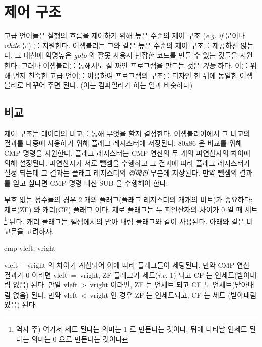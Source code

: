 
\section{제어 구조}
\label{sec:control}
고급 언어들은 실행의 흐름을 제어하기 위해 높은 수준의 제어 구조
(\emph{e.g.} \emph{if} 문이나 \emph{while} 문) 를 지원한다. 어셈블리는
그와 같은 높은 수준의 제어 구조를 제공하진 않는다. 그 대신에 악명높은 
\emph{goto} 와 잘못 사용시 난잡한 코드를 만들 수 있는 것들을 지원한다. 그러나 
어셈블리를 통해서도 잘 짜인 프로그램을 만드는 것은 \emph{가능} 하다. 이를 위해
먼저 친숙한 고급 언어를 이용하여 프로그램의 구조를 디자인 한 뒤에 동일한 어셈블리로
바꾸어 주면 된다. (이는 컴파일러가 하는 일과 비슷하다) 

\subsection{비교} 

제어 구조는 데이터의 비교를 통해 무엇을 할지 결정한다. 어셈블리어에서 그 비교의
결과를 나중에 사용하기 위해 플래그 레지스터에 저장된다. 80x86 은 비교를 위해 
{\code CMP} 명령을 지원한다. 플래그 레지스터는 {\code CMP} 연산의 두 개의
피연산자의 차이에 의해 설정된다. 피연산자가 서로 뺄셈을 수행하고 그 결과에 따라 
플래그 레지스터가 설정 되는데 그 결과는 플래그 레지스터의 \emph{정해진} 부분에 저장된다.
만약 뺄셈의 결과를 얻고 싶다면 {\code CMP} 명령 대신
SUB 을 수행해야 한다. 

부호 없는 정수들의 경우 2 개의 플래그(플래그 레지스터의 개개의 비트)가 중요하다:
제로(ZF)  와 캐리(CF)  플래그 이다. 
제로 플래그는 두 피연산자의 차이가 0 일 때 세트\footnote{역자 주) 여기서 세트 된다는
의미는 1 로 만든다는 것이다. 뒤에 나타날 언세트 된다는 의미는 0 으로 만든다는 것이다}
된다. 캐리 플래그는 뺄셈에서의 받아 내림 플래그와 같이 사용된다. 아래와 같은 비교문을 고려하자.

\begin{AsmCodeListing}[frame=none, numbers=none]
      cmp    vleft, vright
\end{AsmCodeListing}
{\code vleft~-~vright} 의 차이가 계산되어 이에 따라 플래그들이 세팅된다. 만약 {\code CMP}
연산 결과가 0 이라면 {\code vleft~=~vright}, ZF 플래그가 세트(\emph{i.e.} 1) 되고 
CF 는 언세트(받아내림 없음) 된다. 만일 {\code vleft~>~vright} 이라면, ZF 는 언세트 되고
CF 도 언세트(받아내림 없음) 된다. 만약 {\code vleft~<~vright} 인 경우 ZF 는 언세트되고, CF
는 세트 (받아내림 있음) 된다. 

